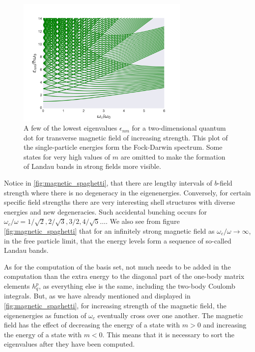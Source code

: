 \begin{figure}
    \centering
    \includegraphics[width=0.75\textwidth]{implementation/figures/spaghetti.png}
    \caption{A few of the lowest eigenvalues $\epsilon_{nm}$ for a two-dimensional 
    quantum dot for transverse magnetic field of increasing strength. This plot of 
    the single-particle energies form the Fock-Darwin spectrum. Some states for very 
    high values of $m$ are omitted to make the formation of Landau bands in strong
    fields more visible.
    \label{fig:magnetic_spaghetti}}
\end{figure}

Notice in \autoref{fig:magnetic_spaghetti}, that there are lengthy intervals of 
$b$-field strength where there is no degeneracy in the eigenenergies. Conversely, 
for certain specific field strengths there are very interesting shell structures with 
diverse energies and new degeneracies. Such accidental bunching occurs 
for $\omega_c/\omega=1/\sqrt{2}, 2/\sqrt{3}, 3/2, 4/\sqrt{5}\dots$.
We also see from figure 
\autoref{fig:magnetic_spaghetti} that for an infinitely strong magnetic field as 
$\omega_c/\omega \to \infty$, in the free particle limit, that the energy levels 
form a sequence of so-called Landau bands. 


As for the computation of the basis set, not much needs to be added in the computation 
than the extra energy to the diagonal part of the one-body matrix elements $h^p_q$, as 
everything else is the same, including the two-body Coulomb integrals. But, as we have 
already mentioned and displayed in \autoref{fig:magnetic_spaghetti}, for increasing 
strength of the magnetic field, the eigenenergies as function  of $\omega_c$ eventually 
cross over one another. The magnetic field has the effect of decreasing the energy of
a state with $m>0$ and increasing the energy of a state with $m<0$. This means that 
it is necessary to sort the eigenvalues after they have been computed. 

